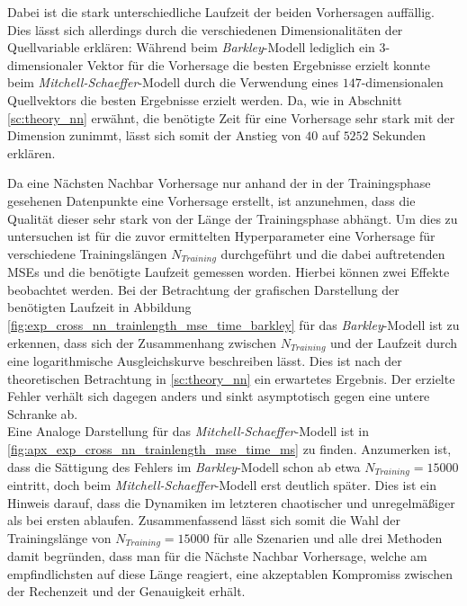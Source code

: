 Dabei ist die stark unterschiedliche Laufzeit der beiden Vorhersagen auffällig. Dies lässt sich allerdings durch die verschiedenen Dimensionalitäten der Quellvariable erklären: Während beim \textit{Barkley}-Modell lediglich ein $3$-dimensionaler Vektor für die Vorhersage die besten Ergebnisse erzielt konnte beim \textit{Mitchell-Schaeffer}-Modell durch die Verwendung eines $147$-dimensionalen Quellvektors die besten Ergebnisse erzielt werden. Da, wie in Abschnitt \ref{sc:theory_nn} erwähnt, die benötigte Zeit für eine Vorhersage sehr stark mit der Dimension zunimmt, lässt sich somit der Anstieg von $40$ auf $5252$ Sekunden erklären.

Da eine Nächsten Nachbar Vorhersage nur anhand der in der Trainingsphase gesehenen Datenpunkte eine Vorhersage erstellt, ist anzunehmen, dass die Qualität dieser sehr stark von der Länge der Trainingsphase abhängt. Um dies zu untersuchen ist für die zuvor ermittelten Hyperparameter eine Vorhersage für verschiedene Trainingslängen $N_{Training}$ durchgeführt und die dabei auftretenden MSEs und die benötigte Laufzeit gemessen worden. Hierbei können zwei Effekte beobachtet werden. Bei der Betrachtung der grafischen Darstellung der benötigten Laufzeit in Abbildung \ref{fig:exp_cross_nn_trainlength_mse_time_barkley} für das \textit{Barkley}-Modell ist zu erkennen, dass sich der Zusammenhang zwischen $N_{Training}$ und der Laufzeit durch eine logarithmische Ausgleichskurve beschreiben lässt. Dies ist nach der theoretischen Betrachtung in \ref{sc:theory_nn} ein erwartetes Ergebnis. Der erzielte Fehler verhält sich dagegen anders und sinkt asymptotisch gegen eine untere Schranke ab.\\

Eine Analoge Darstellung für das \textit{Mitchell-Schaeffer}-Modell ist in \ref{fig:apx_exp_cross_nn_trainlength_mse_time_ms} zu finden. Anzumerken ist, dass die Sättigung des Fehlers im \textit{Barkley}-Modell schon ab etwa $N_{Training}=15000$ eintritt, doch beim \textit{Mitchell-Schaeffer}-Modell erst deutlich später. Dies ist ein Hinweis darauf, dass die Dynamiken im letzteren chaotischer und unregelmäßiger als bei ersten ablaufen. Zusammenfassend lässt sich somit die Wahl der Trainingslänge von $N_{Training} = 15000$ für alle Szenarien und alle drei Methoden damit begründen, dass man für die Nächste Nachbar Vorhersage, welche am empfindlichsten auf diese Länge reagiert, eine akzeptablen Kompromiss zwischen der Rechenzeit und der Genauigkeit erhält.

